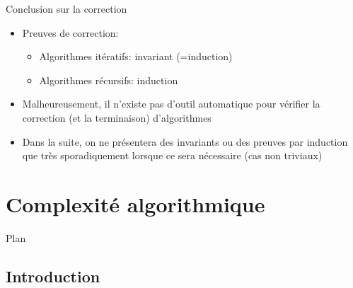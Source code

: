\begin{frame}{Conclusion sur la correction}

\begin{itemize}
\item Preuves de correction:
\begin{itemize}
\item Algorithmes itératifs: invariant (=induction)
\item Algorithmes récursifs: induction
\end{itemize}

\bigskip

\item Malheureusement, il n'existe pas d'outil automatique pour vérifier la correction (et la terminaison) d'algorithmes
\item Dans la suite, on ne présentera des invariants ou des preuves par induction que très sporadiquement lorsque ce sera nécessaire (cas non triviaux)
\end{itemize}


\end{frame}

\section{Complexité algorithmique}

\begin{frame}{Plan}

\tableofcontents[currentsection]

\end{frame}

\subsection{Introduction}

